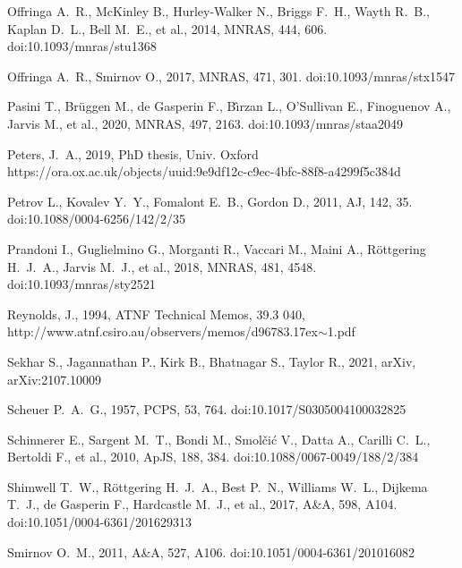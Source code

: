 \documentclass[usenatbib,usedcolumn]{mnras}
\begin{document}
\begin{thebibliography}{}
 Offringa A.~R., McKinley B., Hurley-Walker N., Briggs F.~H., Wayth R.~B., Kaplan D.~L., Bell M.~E., et al., 2014, MNRAS, 444, 606. doi:10.1093/mnras/stu1368

 Offringa A.~R., Smirnov O., 2017, MNRAS, 471, 301. doi:10.1093/mnras/stx1547

 Pasini T., Br{\"u}ggen M., de Gasperin F., B{\^\i}rzan L., O'Sullivan E., Finoguenov A., Jarvis M., et al., 2020, MNRAS, 497, 2163. doi:10.1093/mnras/staa2049

 Peters, J.~A., 2019, PhD thesis, Univ. Oxford https://ora.ox.ac.uk/objects/uuid:9e9df12c-c9ec-4bfc-88f8-a4299f5c384d

 Petrov L., Kovalev Y.~Y., Fomalont E.~B., Gordon D., 2011, AJ, 142, 35. doi:10.1088/0004-6256/142/2/35

 Prandoni I., Guglielmino G., Morganti R., Vaccari M., Maini A., R{\"o}ttgering H.~J.~A., Jarvis M.~J., et al., 2018, MNRAS, 481, 4548. doi:10.1093/mnras/sty2521

Reynolds, J., 1994, ATNF Technical Memos, 39.3 040, http://www.atnf.csiro.au/observers/memos/d96783{\raise.17ex\hbox{$\scriptstyle\sim$}}1.pdf

 Sekhar S., Jagannathan P., Kirk B., Bhatnagar S., Taylor R., 2021, arXiv, arXiv:2107.10009

 Scheuer P.~A.~G., 1957, PCPS, 53, 764. doi:10.1017/S0305004100032825

 Schinnerer E., Sargent M.~T., Bondi M., Smol{\v{c}}i{\'c} V., Datta A., Carilli C.~L., Bertoldi F., et al., 2010, ApJS, 188, 384. doi:10.1088/0067-0049/188/2/384

 Shimwell T.~W., R{\"o}ttgering H.~J.~A., Best P.~N., Williams W.~L., Dijkema T.~J., de Gasperin F., Hardcastle M.~J., et al., 2017, A\&A, 598, A104. doi:10.1051/0004-6361/201629313

 Smirnov O.~M., 2011, A\&A, 527, A106. doi:10.1051/0004-6361/201016082


\end{thebibliography}
\end{document}
